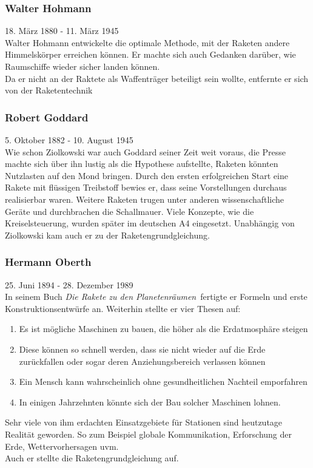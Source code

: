 \documentclass[12pt,a4paper]{article}
\begin{document}
\subsubsection{Walter Hohmann}
 18. März 1880 - 11. März 1945\\
Walter Hohmann entwickelte die optimale Methode, mit der Raketen andere Himmelskörper erreichen können. Er machte sich auch Gedanken darüber, wie Raumschiffe wieder sicher landen können.\\
Da er nicht an der Raktete als Waffenträger beteiligt sein wollte, entfernte er sich von der Raketentechnik

\subsubsection{Robert Goddard}
 5. Oktober 1882 - 10. August 1945\\
Wie schon Ziolkowski war auch Goddard seiner Zeit weit voraus, die Presse machte sich über ihn lustig als die Hypothese aufstellte, Raketen könnten Nutzlasten auf den Mond bringen. Durch den ersten erfolgreichen Start eine Rakete mit flüssigen Treibstoff bewies er, dass seine Vorstellungen durchaus realisierbar waren. Weitere Raketen trugen unter anderen wissenschaftliche Geräte und durchbrachen die Schallmauer. Viele Konzepte, wie die Kreiselsteuerung, wurden später im deutschen A4 eingesetzt. Unabhängig von Ziolkowski kam auch er zu der Raketengrundgleichung.

\subsubsection{Hermann Oberth}
25. Juni 1894 -  28. Dezember 1989\\
In seinem Buch \glqq \textit{Die Rakete zu den Planetenräumen}\grqq ~fertigte er Formeln und erste Konstruktionsentwürfe an. Weiterhin stellte er vier Thesen auf:
\begin{enumerate}
\item Es ist mögliche Maschinen zu bauen, die höher als die Erdatmosphäre steigen
\item Diese können so schnell werden, dass sie nicht wieder auf die Erde zurückfallen oder sogar deren Anziehungsbereich verlassen können
\item Ein Mensch kann wahrscheinlich ohne gesundheitlichen Nachteil \glqq emporfahren \grqq
\item In einigen Jahrzehnten könnte sich der Bau solcher Maschinen lohnen.
\end{enumerate}
Sehr viele von ihm erdachten Einsatzgebiete für Stationen sind heutzutage Realität geworden. So zum Beispiel globale Kommunikation, Erforschung der Erde, Wettervorhersagen uvm.\\
Auch er stellte die Raketengrundgleichung auf.
\end{document}
